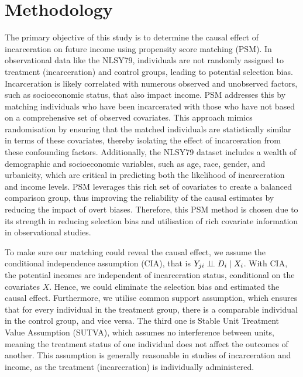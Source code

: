 \documentclass{article}[12pt]
\begin{document}
\section{Methodology} %
The primary objective of this study is to determine the causal effect of incarceration on future income using propensity score matching (PSM). In observational data like the NLSY79, individuals are not randomly assigned to treatment (incarceration) and control groups, leading to potential selection bias. Incarceration is likely correlated with numerous observed and unobserved factors, such as socioeconomic status, that also impact income. PSM addresses this by matching individuals who have been incarcerated with those who have not based on a comprehensive set of observed covariates. This approach mimics randomisation by ensuring that the matched individuals are statistically similar in terms of these covariates, thereby isolating the effect of incarceration from these confounding factors. Additionally, the NLSY79 dataset includes a wealth of demographic and socioeconomic variables, such as age, race, gender, and urbanicity, which are critical in predicting both the likelihood of incarceration and income levels. PSM leverages this rich set of covariates to create a balanced comparison group, thus improving the reliability of the causal estimates by reducing the impact of overt biases. Therefore, this PSM method is chosen due to its strength in reducing selection bias and utilisation of rich covariate information in observational studies. 
\par
To make sure our matching could reveal the causal effect, we assume the conditional independence assumption (CIA), that is $Y_{ji}\perp\kern-5pt\perp D_i \mid X_i$. With CIA, the potential incomes are independent of incarceration status, conditional on the covariates $X$. Hence, we could eliminate the selection bias and estimated the causal effect. Furthermore, we utilise common support assumption, which ensures that for every individual in the treatment group, there is a comparable individual in the control group, and vice versa. The third one is Stable Unit Treatment Value Assumption (SUTVA), which assumes no interference between units, meaning the treatment status of one individual does not affect the outcomes of another. This assumption is generally reasonable in studies of incarceration and income, as the treatment (incarceration) is individually administered. 
\par
\end{document}
